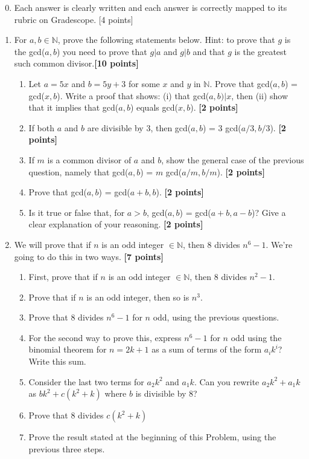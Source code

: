 \documentclass{article}
\begin{document}
\begin{enumerate}
\setcounter{enumi}{-1} 
\item Each answer is clearly written and each answer is correctly mapped to its rubric on Gradescope. [4 points]

\item  For $a,b \in \mathbb{N}$, prove the following statements below. Hint: to prove that $g$ is the gcd($a,b$) you need to prove that $g | a$ and $g|b$ and that $g$ is the greatest such common divisor.\textbf{[10 points]}
\begin{enumerate}
    \item Let $a = 5x$ and $b = 5y+3$ for some $x$ and $y$ in $\mathbb{N}$. Prove that gcd($a,b$) = gcd($x,b$). Write a proof that shows: (i) that gcd($a,b)| x$, then (ii) show that it implies that gcd($a,b$) equals gcd($x,b$). \textbf{[2 points]}
    \item If both $a$ and $b$ are divisible by 3, then gcd($a,b$) = 3 gcd($a/3,b/3$). \textbf{[2 points]}
    \item If $m$ is a common divisor of $a$ and $b$, show the general case of the previous question, namely that gcd($a,b$) = $m$ gcd($a/m,b/m$). \textbf{[2 points]}
    \item Prove that gcd($a,b$) = gcd($a+b,b$). \textbf{[2 points]}
    \item Is it true or false that, for $a>b$, gcd($a,b$) = gcd($a+b,a-b$)? Give a clear explanation of your reasoning. \textbf{[2 points]}
\end{enumerate}

\item We will prove that if $n$ is an odd integer $\in \mathbb{N}$, then 8 divides $n^6 - 1$. We're going to do this in two ways. \textbf{[7 points]} 
\begin{enumerate}
    \item First, prove that if $n$ is an odd integer $\in \mathbb{N}$, then 8 divides $n^2 - 1$.
    \item Prove that if $n$ is an odd integer, then so is $n^3$.
    \item Prove that 8 divides $n^6-1$ for $n$ odd, using the previous questions.
    \item For the second way to prove this, express $n^6-1$ for $n$ odd using the binomial theorem for $n = 2k+1$ as a sum of terms of the form $a_i k^i$? Write this sum.
    \item Consider the last two terms for $a_2 k^2$ and $a_1 k$. Can you rewrite $a_2 k^2 + a_1 k$ as $b k^2 + c (k^2 + k)$ where $b$ is divisible by 8?
    \item Prove that 8 divides $c (k^2 +k)$
    \item Prove the result stated at the beginning of this Problem, using the previous three steps. 
\end{enumerate}


\end{enumerate}
\end{document}

